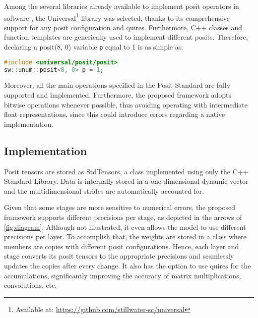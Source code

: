 \documentclass{article}
\begin{document}
	Among the several libraries already available to implement posit operators in software \cite{NGATeam2019}, the Universal\footnote{Available at: \href{https://github.com/stillwater-sc/universal}{https://github.com/stillwater-sc/universal}} library was selected, thanks to its comprehensive support for any posit configuration and quires. Furthermore, C++ classes and function templates are generically used to implement different posits. Therefore, declaring a posit(8, 0) variable \texttt{p} equal to 1 is as simple as:
	\begin{lstlisting}[language=C++, basicstyle=\small\ttfamily, frame=leftline]
#include <universal/posit/posit>
sw::unum::posit<8, 0> p = 1;
	\end{lstlisting}
	Moreover, all the main operations specified in the Posit Standard \cite{Group2018} are fully supported and implemented. Furthermore, the proposed framework adopts bitwise operations whenever possible, thus avoiding operating with intermediate float representations, since this could introduce errors regarding a native implementation.
	
	
	\subsection{Implementation}
	
	Posit tensors are stored as StdTensors, a class implemented using only the C++ Standard Library. Data is internally stored in a one-dimensional dynamic vector and the multidimensional strides are automatically accounted for.
	
	Given that some stages are more sensitive to numerical errors, the proposed framework supports different precisions per stage, as depicted in the arrows of \cref{fig:diagram}. Although not illustrated, it even allows the model to use different precisions per layer. To accomplish that, the weights are stored in a class where members are copies with different posit configurations. Hence, each layer and stage converts its posit tensors to the appropriate precisions and seamlessly updates the copies after every change. It also has the option to use quires for the accumulations, significantly improving the accuracy of matrix multiplications, convolutions, etc.
	
\end{document}
